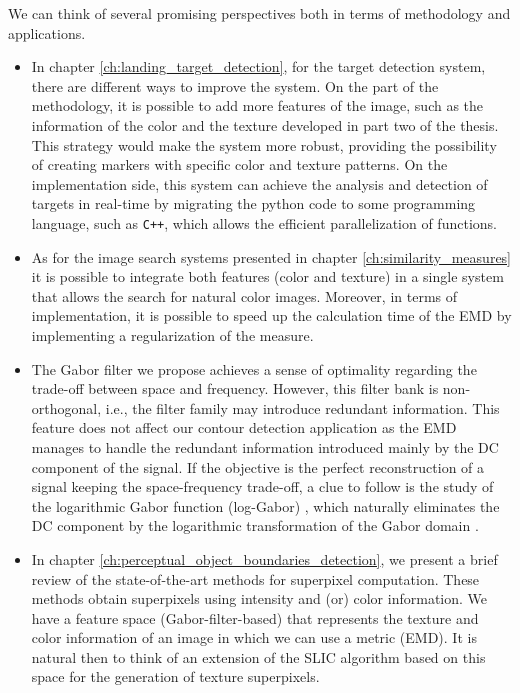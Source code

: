 We can think of several promising perspectives both in terms of methodology and applications.

\begin{itemize}
	\item In chapter \ref{ch:landing_target_detection}, for the target detection system, there are different ways to improve the system. On the part of the methodology, it is possible to add more features of the image, such as the information of the color and the texture developed in part two of the thesis. This strategy would make the system more robust, providing the possibility of creating markers with specific color and texture patterns. On the implementation side, this system can achieve the analysis and detection of targets in real-time by migrating the python code to some programming language, such as \verb!C++!, which allows the efficient parallelization of functions.
	
	 \item As for the image search systems presented in chapter \ref{ch:similarity_measures} it is possible to integrate both features (color and texture) in a single system that allows the search for natural color images. Moreover, in terms of implementation, it is possible to speed up the calculation time of the EMD by implementing a regularization of the measure.
	 
	 \item The Gabor filter we propose achieves a sense of optimality regarding the trade-off between space and frequency. However, this filter bank is non-orthogonal, i.e., the filter family may introduce redundant information. This feature does not affect our contour detection application as the EMD manages to handle the redundant information introduced mainly by the DC component of the signal.  If the objective is the perfect reconstruction of a signal keeping the space-frequency trade-off, a clue to follow is the study of the logarithmic Gabor function (log-Gabor) \citep{Field:OSA:1987}, which naturally eliminates the DC component by the logarithmic transformation of the Gabor domain \citep{Boukerroui.Noble.ea:JMIV:2004}.
	 
	 \item In chapter \ref{ch:perceptual_object_boundaries_detection}, we present a brief review of the state-of-the-art methods for superpixel computation. These methods obtain superpixels using intensity and (or) color information. We have a feature space (Gabor-filter-based) that represents the texture and color information of an image in which we can use a metric (EMD). It is natural then to think of an extension of the SLIC algorithm based on this space for the generation of texture superpixels. 
	 

\end{itemize}
